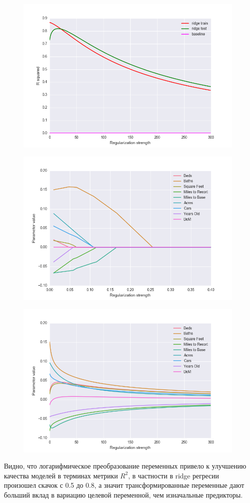 \documentclass[a4paper, 12pt, oneside]{scrartcl}
\numberwithin{equation}{section}
\numberwithin{table}{section}
\numberwithin{figure}{section}
\begin{document}
\begin{figure}[H]
    \centering
    \includegraphics[width=\linewidth]{r2_ridge.png}
\end{figure}
\newpage
\begin{figure}
    \centering
    \includegraphics[width=\linewidth]{lasso__params.png}
\end{figure}

\begin{figure}
    \centering
    \includegraphics[width=\linewidth]{ridge__params.png}
\end{figure}

Видно, что логарифмическое преобразование переменных привело к улучшению качества 
моделей в терминах метрики $ R^2 $, в частности в ridge регресии произошел скачок с 
0.5 до 0.8, а значит трансформированные переменные дают больший вклад в вариацию целевой переменной, 
чем изначальные предикторы.
\end{document}
